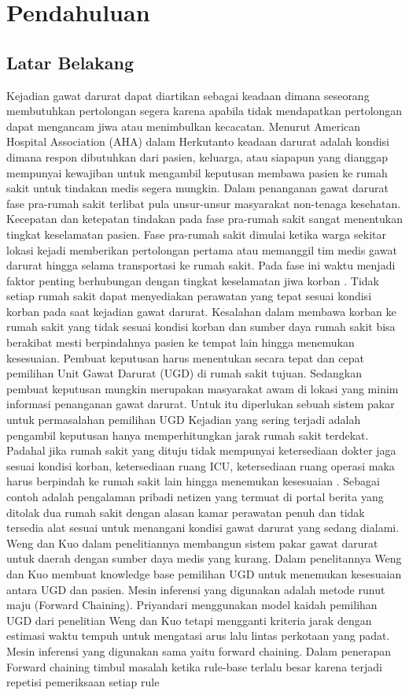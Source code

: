 \chapter{Pendahuluan}
\section{Latar Belakang}
Kejadian gawat darurat dapat diartikan sebagai keadaan dimana seseorang membutuhkan pertolongan segera karena apabila tidak mendapatkan pertolongan dapat mengancam jiwa atau menimbulkan kecacatan. Menurut American Hospital Association (AHA) dalam Herkutanto \cite{herkutanto2007} keadaan darurat adalah kondisi dimana respon dibutuhkan dari pasien, keluarga, atau siapapun yang dianggap mempunyai kewajiban untuk mengambil keputusan membawa pasien ke rumah sakit untuk tindakan medis segera mungkin. Dalam penanganan gawat darurat fase pra-rumah sakit terlibat pula unsur-unsur masyarakat non-tenaga kesehatan. Kecepatan dan ketepatan tindakan pada fase pra-rumah sakit sangat menentukan tingkat keselamatan pasien.
Fase pra-rumah sakit dimulai ketika warga sekitar lokasi kejadi memberikan pertolongan pertama atau memanggil tim medis gawat darurat hingga selama transportasi ke rumah sakit. Pada fase ini waktu menjadi faktor penting berhubungan dengan tingkat keselamatan jiwa korban \cite{boswick}. Tidak setiap rumah sakit dapat menyediakan perawatan yang tepat sesuai kondisi korban pada saat kejadian gawat darurat. Kesalahan dalam membawa korban ke rumah sakit yang tidak sesuai kondisi korban dan sumber daya rumah sakit bisa berakibat mesti berpindahnya pasien ke tempat lain hingga menemukan kesesuaian. Pembuat keputusan harus menentukan secara tepat dan cepat pemilihan Unit Gawat Darurat (UGD) di rumah sakit tujuan. Sedangkan pembuat keputusan mungkin merupakan masyarakat awam di lokasi yang minim informasi penanganan gawat darurat. Untuk itu diperlukan sebuah sistem pakar untuk permasalahan pemilihan UGD
Kejadian yang sering terjadi adalah pengambil keputusan hanya memperhitungkan jarak rumah sakit terdekat. Padahal jika rumah sakit yang dituju tidak mempunyai ketersediaan dokter jaga sesuai kondisi korban, ketersediaan ruang ICU, ketersediaan ruang operasi maka harus berpindah ke rumah sakit lain hingga menemukan kesesuaian \cite{weng2009}. Sebagai contoh adalah pengalaman pribadi netizen yang termuat di portal berita \cite{priyono2015} yang ditolak dua rumah sakit dengan alasan kamar perawatan penuh dan tidak tersedia alat sesuai untuk menangani kondisi gawat darurat yang sedang dialami.
Weng dan Kuo \cite{weng2009} dalam penelitiannya membangun sistem pakar gawat darurat untuk daerah dengan sumber daya medis yang kurang. Dalam penelitannya Weng dan Kuo membuat knowledge base pemilihan UGD untuk menemukan kesesuaian antara UGD dan pasien. Mesin inferensi yang digunakan adalah metode runut maju (Forward Chaining). Priyandari \cite{priyandari2011} menggunakan model kaidah pemilihan UGD dari penelitian Weng dan Kuo tetapi mengganti kriteria jarak dengan estimasi waktu tempuh untuk mengatasi arus lalu lintas perkotaan yang padat. Mesin inferensi yang digunakan sama yaitu forward chaining. Dalam penerapan Forward chaining timbul masalah ketika rule-base terlalu besar karena terjadi repetisi pemeriksaan setiap rule
